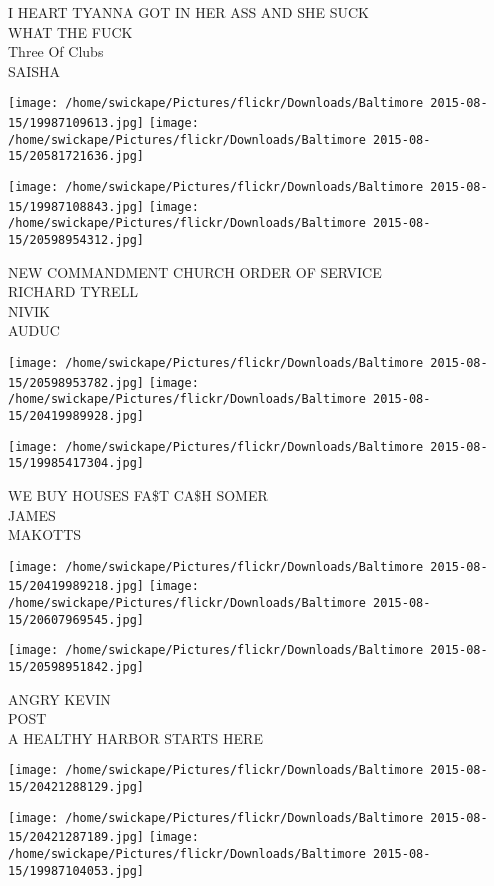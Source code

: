 \documentclass[10pt,letterpaper]{article}
\begin{document}
I HEART TYANNA GOT IN HER ASS AND SHE SUCK\\
WHAT THE FUCK\\
Three Of Clubs\\
SAISHA
\pagebreak

\texttt{[image: /home/swickape/Pictures/flickr/Downloads/Baltimore 2015-08-15/19987109613.jpg]}
\texttt{[image: /home/swickape/Pictures/flickr/Downloads/Baltimore 2015-08-15/20581721636.jpg]}

\texttt{[image: /home/swickape/Pictures/flickr/Downloads/Baltimore 2015-08-15/19987108843.jpg]}
\texttt{[image: /home/swickape/Pictures/flickr/Downloads/Baltimore 2015-08-15/20598954312.jpg]}

NEW COMMANDMENT CHURCH ORDER OF SERVICE\\
RICHARD TYRELL\\
NIVIK\\
AUDUC
\pagebreak

\texttt{[image: /home/swickape/Pictures/flickr/Downloads/Baltimore 2015-08-15/20598953782.jpg]}
\texttt{[image: /home/swickape/Pictures/flickr/Downloads/Baltimore 2015-08-15/20419989928.jpg]}

\vspace{0.25in}
\texttt{[image: /home/swickape/Pictures/flickr/Downloads/Baltimore 2015-08-15/19985417304.jpg]}

WE BUY HOUSES FA\$T CA\$H SOMER\\
JAMES\\
MAKOTTS
\pagebreak

\texttt{[image: /home/swickape/Pictures/flickr/Downloads/Baltimore 2015-08-15/20419989218.jpg]}
\texttt{[image: /home/swickape/Pictures/flickr/Downloads/Baltimore 2015-08-15/20607969545.jpg]}

\texttt{[image: /home/swickape/Pictures/flickr/Downloads/Baltimore 2015-08-15/20598951842.jpg]}

ANGRY KEVIN\\
POST\\
A HEALTHY HARBOR STARTS HERE
\pagebreak

\texttt{[image: /home/swickape/Pictures/flickr/Downloads/Baltimore 2015-08-15/20421288129.jpg]}

\vspace{0.25in}
\texttt{[image: /home/swickape/Pictures/flickr/Downloads/Baltimore 2015-08-15/20421287189.jpg]}
\texttt{[image: /home/swickape/Pictures/flickr/Downloads/Baltimore 2015-08-15/19987104053.jpg]}
\end{document}
